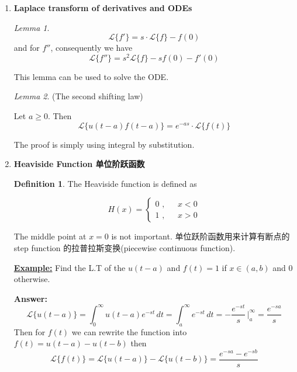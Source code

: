 \documentclass[9pt]{article}
\theoremstyle{definition}
\newtheorem{definition}{Definition}
\newenvironment{changemargin}[2]{%
  \begin{list}{}{%
    \setlength{\topsep}{0pt}%
    \setlength{\leftmargin}{#1}%
    \setlength{\rightmargin}{#2}%
    \setlength{\listparindent}{\parindent}%
    \setlength{\itemindent}{\parindent}%
    \setlength{\parsep}{\parskip}%
  }%
  \item[]}{\end{list}}
\theoremstyle{theorem}
\theoremstyle{remark}
\theoremstyle{lemma}
\newtheorem{lemma}{Lemma}
\begin{document}
\begin{changemargin}{-0.125in}{0in}
\begin{enumerate}
\begin{enumerate}
        \item \textbf{Laplace transform of derivatives and ODEs}
        
        \medskip
        
        
        \begin{lemma}
        	\[
        	\mathcal{L}\{f'\} = s\cdot \mathcal{L}\{f\} - f(0)
        	\]
        	and for $f''$, consequently we have
        	\[
        	\mathcal{L}\{f''\} = s^2\mathcal{L}\{f\} - sf(0) - f'(0)
        	\]
        \end{lemma}
        This lemma can be used to solve the ODE. 
        
        \begin{lemma}(The second shifting law)
        
        Let $a \geq 0$. Then 
        \[
        \mathcal{L}\{u(t-a)f(t-a)\} = e^{-as} \cdot \mathcal{L}\{f(t)\}
        \]
        	
        \end{lemma}
        
        The proof is simply using integral by substitution. 
        \medskip
        
        \item \textbf{Heaviside Function 单位阶跃函数}
        
        \begin{definition}
        	The Heaviside function is defined as 
        	
        	\medskip
        	
        	\[
        	H(x) =
        	\left\{
                    \begin{aligned}
                        0 \,\,, & \,\, x < 0 \\
                        1 \,\,, \,\, & \,\, x > 0
                    \end{aligned}
                    \right.
        	\]
        \end{definition}
        The middle point at $x = 0$ is not important. 单位跃阶函数用来计算有断点的step function 的拉普拉斯变换(piecewise continuous function). 
        
        \medskip 
        
        \medskip
        
        \underline{\textbf{Example:}} Find the L.T of the $u(t-a)$ and $f(t) = 1$ if $x \in (a,b)$ and $0$ otherwise.

        \medskip
        
        \textbf{Answer: }
        \[
        \mathcal{L}\{u(t-a)\} = \int^\infty_0 u(t-a)e^{-st}\,dt = \int^\infty_a e^{-st} \,dt = -\frac{e^{-st}}{s}\,\bigg|^\infty_a = \frac{e^{-sa}}{s}
        \]
        Then for $f(t)$ we can rewrite the function into $f(t) = u(t - a) -u(t - b)$ then 
        \[
        \mathcal{L}\{f(t)\} = \mathcal{L}\{u(t -a)\} - \mathcal{L}\{u(t - b)\} = \frac{e^{-sa} - e^{-sb}}{s}
        \]
        

\end{enumerate}
\end{enumerate}
\end{changemargin}
\end{document}
